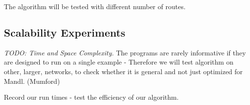 The algorithm will be tested with different number of routes.



\subsection{Scalability Experiments}
\emph{\color{blue} TODO: Time and Space Complexity.}
The programs are rarely informative if they are designed to run on a single example - Therefore we will test algorithm on other, larger, networks, to check whether it is general and not just optimized for Mandl. (Mumford)


Record our run times - test the efficiency of our algorithm.




